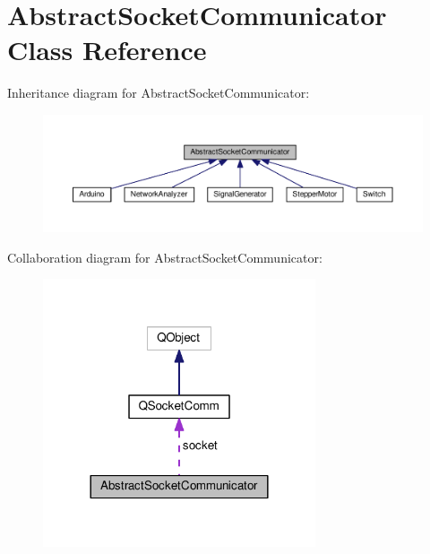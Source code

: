 \hypertarget{class_abstract_socket_communicator}{}\section{Abstract\+Socket\+Communicator Class Reference}
\label{class_abstract_socket_communicator}


Inheritance diagram for Abstract\+Socket\+Communicator\+:
\nopagebreak
\begin{figure}[H]
\begin{center}
\leavevmode
\includegraphics[width=350pt]{class_abstract_socket_communicator__inherit__graph}
\end{center}
\end{figure}


Collaboration diagram for Abstract\+Socket\+Communicator\+:\nopagebreak
\begin{figure}[H]
\begin{center}
\leavevmode
\includegraphics[width=228pt]{class_abstract_socket_communicator__coll__graph}
\end{center}
\end{figure}
